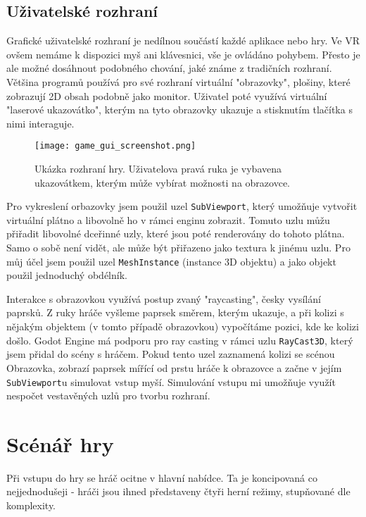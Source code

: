 \label{uzivatelske_rozhrani}
\section{Uživatelské rozhraní}

Grafické uživatelské rozhraní je nedílnou součástí každé aplikace nebo hry. Ve VR ovšem nemáme k dispozici myš ani klávesnici, vše je ovládáno pohybem. Přesto je ale možné dosáhnout podobného chování, jaké známe z tradičních rozhraní. Většina programů používá pro své rozhraní virtuální "obrazovky", plošiny, které zobrazují 2D obsah podobně jako monitor. Uživatel poté využívá virtuální "laserové ukazovátko", kterým na tyto obrazovky ukazuje a stisknutím tlačítka s nimi interaguje.

\begin{figure}[H]
  \centering
  \texttt{[image: game\_gui\_screenshot.png]}
  \caption{Ukázka rozhraní hry. Uživatelova pravá ruka je vybavena ukazovátkem, kterým může vybírat možnosti na obrazovce.}
  \label{game_gui_screenshot}
\end{figure}

Pro vykreslení orbazovky jsem použil uzel \texttt{SubViewport}, který umožňuje vytvořit virtuální plátno a libovolně ho v rámci enginu zobrazit. Tomuto uzlu můžu přiřadit libovolné dceřinné uzly, které jsou poté renderovány do tohoto plátna. Samo o sobě není vidět, ale může být přiřazeno jako textura k jinému uzlu. Pro můj účel jsem použil uzel \texttt{MeshInstance} (instance 3D objektu) a jako objekt použil jednoduchý obdélník.

Interakce s obrazovkou využívá postup zvaný "raycasting", česky vysílání paprsků. Z ruky hráče vyšleme paprsek směrem, kterým ukazuje, a při kolizi s nějakým objektem (v tomto případě obrazovkou) vypočítáme pozici, kde ke kolizi došlo. Godot Engine má podporu pro ray casting v rámci uzlu \texttt{RayCast3D}, který jsem přidal do scény s hráčem. Pokud tento uzel zaznamená kolizi se scénou Obrazovka, zobrazí paprsek mířící od prstu hráče k obrazovce a začne v jejím \texttt{SubViewport}u simulovat vstup myší. Simulování vstupu mi umožňuje využít nespočet vestavěných uzlů pro tvorbu rozhraní.

\chapter{Scénář hry}

Při vstupu do hry se hráč ocitne v hlavní nabídce. Ta je koncipovaná co nejjednodušeji - hráči jsou ihned představeny čtyři herní režimy, stupňované dle komplexity.

